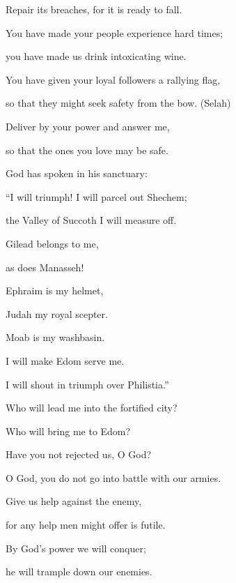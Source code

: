 {\par }{\Q Repair
its breaches,
for
it is ready to fall.
\par }{\Q {}You have made your people
experience
hard
times;

\par }{\Q you have made us drink
intoxicating
wine.
\par }{\Q {}You have given
your loyal followers
a rallying flag,
\par }{\Q so that they might seek safety
from the bow. (Selah)
\par }{\Q {}Deliver
by your power
and answer
me,

\par }{\Q so that
the ones you love
may be safe.
\par }{\Q {}God
has spoken
in his sanctuary:

\par }{\Q “I will triumph! I will parcel
out Shechem;
\par }{\Q the Valley
of Succoth
I will measure off.
\par }{\Q {}Gilead
belongs to me,
\par }{\Q as does Manasseh!

\par }{\Q Ephraim
is my helmet,
\par }{\Q Judah
my royal scepter.
\par }{\Q {}Moab
is my washbasin.
\par }{\Q I will make
Edom
serve
me.

\par }{\Q I will shout in triumph
over
Philistia.”
\par }{\Q {}Who
will lead me into
the fortified
city?
\par }{\Q Who
will bring me
to Edom?
\par }{\Q {}Have you not
rejected
us, O
God?
\par }{\Q O God,
you do not
go
into battle
with our armies.
\par }{\Q {}Give
us help
against the enemy,
\par }{\Q for any help
men
might offer is futile.
\par }{\Q {}By God’s
power
we will conquer;
\par }{\Q he
will trample down
our enemies.


}
